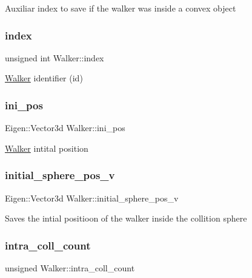 Auxiliar index to save if the walker was inside a convex object \mbox{\label{class_walker_a58e2d14d760748687138b7582cd04365}} 
\subsubsection{\texorpdfstring{index}{index}}
{\footnotesize\ttfamily unsigned int Walker\+::index}

\hyperlink{class_walker}{Walker} identifier (id) \mbox{\label{class_walker_a98116f0e5d65e1cf65449d80a2d87617}} 
\subsubsection{\texorpdfstring{ini\+\_\+pos}{ini\_pos}}
{\footnotesize\ttfamily Eigen\+::\+Vector3d Walker\+::ini\+\_\+pos}

\hyperlink{class_walker}{Walker} intital position \mbox{\label{class_walker_a8a27ead68d3dc7140afbec2710fb3176}} 
\subsubsection{\texorpdfstring{initial\+\_\+sphere\+\_\+pos\+\_\+v}{initial\_sphere\_pos\_v}}
{\footnotesize\ttfamily Eigen\+::\+Vector3d Walker\+::initial\+\_\+sphere\+\_\+pos\+\_\+v}

Saves the intial positioon of the walker inside the collition sphere \mbox{\label{class_walker_a8ca6c90f124e46869ea752920565e2c2}} 
\subsubsection{\texorpdfstring{intra\+\_\+coll\+\_\+count}{intra\_coll\_count}}
{\footnotesize\ttfamily unsigned Walker\+::intra\+\_\+coll\+\_\+count}

